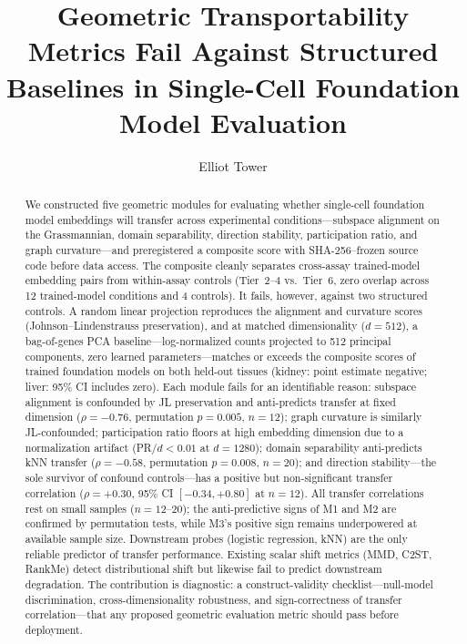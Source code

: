 \documentclass[9pt,lineno]{elife}
\title{Geometric Transportability Metrics Fail Against Structured Baselines in Single-Cell Foundation Model Evaluation}
\author[1]{Elliot Tower}
\affil[1]{Independent Researcher}
\begin{document}
\maketitle

\begin{abstract}
We constructed five geometric modules for evaluating whether single-cell foundation model embeddings will transfer across experimental conditions---subspace alignment on the Grassmannian, domain separability, direction stability, participation ratio, and graph curvature---and preregistered a composite score with SHA-256--frozen source code before data access. The composite cleanly separates cross-assay trained-model embedding pairs from within-assay controls (Tier~2--4 vs.\ Tier~6, zero overlap across 12 trained-model conditions and 4 controls). It fails, however, against two structured controls. A random linear projection reproduces the alignment and curvature scores (Johnson--Lindenstrauss preservation), and at matched dimensionality ($d = 512$), a bag-of-genes PCA baseline---log-normalized counts projected to 512 principal components, zero learned parameters---matches or exceeds the composite scores of trained foundation models on both held-out tissues (kidney: point estimate negative; liver: 95\% CI includes zero). Each module fails for an identifiable reason: subspace alignment is confounded by JL preservation and anti-predicts transfer at fixed dimension ($\rho = -0.76$, permutation $p = 0.005$, $n = 12$); graph curvature is similarly JL-confounded; participation ratio floors at high embedding dimension due to a normalization artifact (PR$/d < 0.01$ at $d = 1280$); domain separability anti-predicts kNN transfer ($\rho = -0.58$, permutation $p = 0.008$, $n = 20$); and direction stability---the sole survivor of confound controls---has a positive but non-significant transfer correlation ($\rho = +0.30$, 95\% CI $[-0.34, +0.80]$ at $n = 12$). All transfer correlations rest on small samples ($n = 12$--$20$); the anti-predictive signs of M1 and M2 are confirmed by permutation tests, while M3's positive sign remains underpowered at available sample size. Downstream probes (logistic regression, kNN) are the only reliable predictor of transfer performance. Existing scalar shift metrics (MMD, C2ST, RankMe) detect distributional shift but likewise fail to predict downstream degradation. The contribution is diagnostic: a construct-validity checklist---null-model discrimination, cross-dimensionality robustness, and sign-correctness of transfer correlation---that any proposed geometric evaluation metric should pass before deployment.
\end{abstract}
\end{document}
